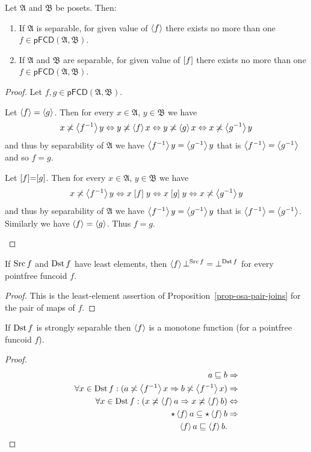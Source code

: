 \begin{thm}
\label{one-funcoid}Let $\mathfrak{A}$ and $\mathfrak{B}$ be posets.
Then:
\begin{enumerate}
\item \label{pf-fun-one}If $\mathfrak{A}$ is separable, for given value
of $\left\langle f\right\rangle$ there exists no more than one $f\in\mathsf{pFCD}(\mathfrak{A},\mathfrak{B})$.
\item \label{pf-rel-one}If $\mathfrak{A}$ and $\mathfrak{B}$ are separable,
for given value of $\mathrel{\left[f\right]}$ there exists no more than one $f\in\mathsf{pFCD}(\mathfrak{A},\mathfrak{B})$.
\end{enumerate}
\end{thm}
\begin{proof}
Let $f,g\in\mathsf{pFCD}(\mathfrak{A},\mathfrak{B})$.
\begin{widedisorder}
\item [{\ref{pf-fun-one}}] Let $\left\langle f\right\rangle=\left\langle g\right\rangle$. Then for every
$x\in\mathfrak{A}$, $y\in\mathfrak{B}$ we have
\[
x\not\asymp\left\langle f^{-1}\right\rangle y\Leftrightarrow y\not\asymp\left\langle f\right\rangle x\Leftrightarrow y\not\asymp\left\langle g\right\rangle x\Leftrightarrow x\not\asymp\left\langle g^{-1}\right\rangle y
\]
and thus by separability of $\mathfrak{A}$ we have $\left\langle f^{-1}\right\rangle y=\left\langle g^{-1}\right\rangle y$
that is $\left\langle f^{-1}\right\rangle=\left\langle g^{-1}\right\rangle$ and so $f=g$.
\item [{\ref{pf-rel-one}}] Let $\mathrel{\left[f\right]}=\mathrel{\left[g\right]}$. Then for every
$x\in\mathfrak{A}$, $y\in\mathfrak{B}$ we have
\[
x\not\asymp\left\langle f^{-1}\right\rangle y\Leftrightarrow x\mathrel{\left[f\right]}y\Leftrightarrow x\mathrel{\left[g\right]}y\Leftrightarrow x\not\asymp\left\langle g^{-1}\right\rangle y
\]
and thus by separability of $\mathfrak{A}$ we have $\left\langle f^{-1}\right\rangle y=\left\langle g^{-1}\right\rangle y$
that is $\left\langle f^{-1}\right\rangle=\left\langle g^{-1}\right\rangle$. Similarly we have $\left\langle f\right\rangle=\left\langle g\right\rangle$.
Thus $f=g$.
\end{widedisorder}
\end{proof}
\begin{prop}
\label{pfcd-zero}If $\operatorname{Src} f$ and $\operatorname{Dst} f$ have least elements,
then $\left\langle f\right\rangle\bot^{\operatorname{Src} f}=\bot^{\operatorname{Dst} f}$ for every pointfree funcoid
$f$.\end{prop}
\begin{proof}
This is the least-element assertion of Proposition~\ref{prop-osa-pair-joins}
for the pair of maps of $f$.
\end{proof}

\begin{prop}
\label{pfcd-mono}If $\operatorname{Dst} f$ is strongly separable then
$\left\langle f\right\rangle$ is a monotone function (for a pointfree funcoid $f$).\end{prop}
\begin{proof}
~
\begin{align*}
a\sqsubseteq b & \Rightarrow\\
\forall x\in\operatorname{Dst} f:(a\not\asymp\left\langle f^{-1}\right\rangle x\Rightarrow b\not\asymp\left\langle f^{-1}\right\rangle x) & \Rightarrow\\
\forall x\in\operatorname{Dst} f:(x\not\asymp\left\langle f\right\rangle a\Rightarrow x\not\asymp\left\langle f\right\rangle b) & \Leftrightarrow\\
\star\left\langle f\right\rangle a\subseteq\star\left\langle f\right\rangle b & \Rightarrow\\
\left\langle f\right\rangle a\sqsubseteq\left\langle f\right\rangle b.
\end{align*}
\end{proof}

